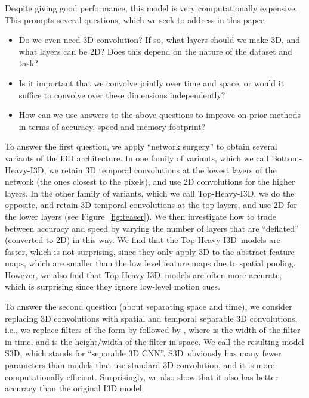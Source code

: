 \documentclass[runningheads]{llncs}
\newcommand{\pyramid}{Bottom-Heavy-I3D}
\newcommand{\invpyramid}{Top-Heavy-I3D}
\newcommand{\Sep}{S3D} \newcommand{\SG}{S3D-G}
\begin{document}
Despite giving good performance, 
this model is very computationally expensive.  This prompts several questions, which we seek to 
address in this paper:
\begin{itemize}

\item Do we even need 3D convolution? If so, what layers should we make 3D, and what layers can be 2D? Does this depend on the nature of the dataset and task?

\item Is it important that we convolve jointly over time and space, or would it suffice to convolve over these dimensions independently?

\item How can we use answers to the above questions to improve on prior methods in terms of accuracy, speed and memory footprint?
\end{itemize}

To answer the first question,
we apply ``network surgery'' to obtain several
variants of the I3D architecture.
In one family of variants, which we call \pyramid, we retain 3D temporal convolutions at the lowest layers of the network
(the ones closest to the pixels), and use 2D convolutions for the higher layers.
In the other family of variants, which we call \invpyramid, we do the opposite, and retain 3D temporal convolutions at the top layers, and use 2D for the lower layers
(see Figure~\ref{fig:teaser}).
We then investigate how to trade between accuracy and speed by varying 
the number of layers that are ``deflated'' (converted to 2D) in this way. 
We find that the \invpyramid\ models are faster,
which is not surprising, since they only apply 3D to the abstract feature maps, which are smaller than the low level feature maps due to spatial pooling.
However, we also find that \invpyramid\ models are often more accurate, which is surprising since they ignore low-level motion cues.


To answer the second question (about separating space and time), we consider replacing 3D convolutions
with spatial and temporal separable 3D convolutions,
i.e., we replace filters of the form 
by  followed by ,
where  is the width of the filter in time,
and  is the height/width of the filter in space.
We call the resulting model \Sep, which stands for ``separable 3D CNN''.
\Sep\ obviously has many fewer parameters than models that use standard 3D convolution,
and it is more computationally efficient.
Surprisingly, we also show that it also has better accuracy than the original I3D model.
\end{document}
